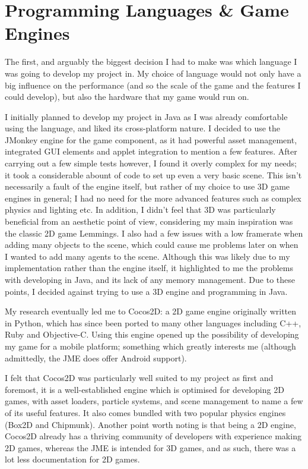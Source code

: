 \documentclass[a4paper,oneside]{report}
\begin{document}
\section{Programming Languages \& Game Engines}

The first, and arguably the biggest decision I had to make was which language I was going to develop my project in. My choice of language would not only have a big influence on the performance (and so the scale of the game and the features I could develop), but also the hardware that my game would run on.  

I initially planned to develop my project in Java as I was already comfortable using the language, and liked its cross-platform nature. I decided to use the JMonkey engine for the game component, as it had powerful asset management, integrated GUI elements and applet integration to mention a few features. After carrying out a few simple tests however, I found it overly complex for my needs; it took a considerable abount of code to set up even a very basic scene. This isn't necessarily a fault of the engine itself, but rather of my choice to use 3D game engines in general; I had no need for the more advanced features such as complex physics and lighting etc. In addition, I didn't feel that 3D was particularly beneficial from an aesthetic point of view, considering my main inspiration was the classic 2D game Lemmings. I also had a few issues with a low framerate when adding many objects to the scene, which could cause me problems later on when I wanted to add many agents to the scene. Although this was likely due to my implementation rather than the engine itself, it highlighted to me the problems with developing in Java, and its lack of any memory management. Due to these points, I decided against trying to use a 3D engine and programming in Java.

My research eventually led me to Cocos2D: a 2D game engine originally written in Python, which has since been ported to many other languages including C++, Ruby and Objective-C. Using this engine opened up the possibility of developing my game for a mobile platform; something which greatly interests me (although admittedly, the JME does offer Android support).

I felt that Cocos2D was particularly well suited to my project as first and foremost, it is a well-established engine which is optimised for developing 2D games, with asset loaders, particle systems, and scene management to name a few of its useful features. It also comes bundled with two popular physics engines (Box2D and Chipmunk). Another point worth noting is that being a 2D engine, Cocos2D already has a thriving community of developers with experience making 2D games, whereas the JME is intended for 3D games, and as such, there was a lot less documentation for 2D games. 
\end{document}

